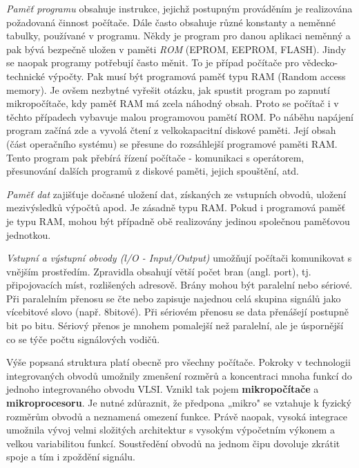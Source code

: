     \emph{Paměť programu} obsahuje instrukce, jejichž postupným prováděním je realizována požadovaná činnost 
    počítače. Dále často obsahuje různé konstanty a neměnné tabulky, používané v programu. Někdy je program 
    pro danou aplikaci neměnný a pak bývá bezpečně uložen v paměti \emph{ROM} (EPROM, EEPROM, FLASH). Jindy 
    se naopak programy potřebují často měnit. To je případ počítače pro vědecko-technické výpočty. Pak musí 
    být programová paměť typu RAM (Random access memory). Je ovšem nezbytné vyřešit otázku, jak spustit 
    program po zapnutí mikropočítače, kdy paměť RAM má zcela náhodný obsah. Proto se počítač i v těchto 
    případech vybavuje malou programovou pamětí ROM. Po náběhu napájení program začíná zde a vyvolá čtení z 
    velkokapacitní diskové paměti. Její obsah (část operačního systému) se přesune do rozsáhlejší programové 
    paměti RAM. Tento program pak přebírá řízení počítače - komunikaci s operátorem, přesunování dalších 
    programů z diskové paměti, jejich spouštění, atd.
    
    \emph{Paměť dat} zajišťuje dočasné uložení dat, získaných ze vstupních obvodů, uložení mezivýsledků 
    výpočtů apod. Je zásadně typu RAM. Pokud i programová paměť je typu RAM, mohou být případně obě 
    realizovány jedinou společnou paměťovou jednotkou.
    
    \emph{Vstupní a výstupní obvody (l/O - Input/Output)} umožňují počítači komunikovat s vnějším prostředím. 
    Zpravidla obsahují větší počet bran (angl. port), tj. připojovacích míst, rozlišených adresově. Brány 
    mohou být paralelní nebo sériové. Při paralelním přenosu se čte nebo zapisuje najednou celá skupina 
    signálů jako vícebitové slovo (např. 8bitové). Při sériovém přenosu se data přenášejí postupně bit po 
    bitu. Sériový přenos je mnohem pomalejší než paralelní, ale je úspornější co se týče počtu signálových 
    vodičů.
    
    Výše popsaná struktura platí obecně pro všechny počítače. Pokroky v technologii integrovaných obvodů 
    umožnily zmenšení rozměrů a koncentraci mnoha funkcí do jednoho integrovaného obvodu VLSI. Vznikl tak 
    pojem \textbf{mikropočítače} a \textbf{mikroprocesoru}. Je nutné zdůraznit, že předpona „mikro" se 
    vztahuje k fyzický rozměrům obvodů a neznamená omezení funkce. Právě naopak, vysoká integrace umožnila 
    vývoj velmi složitých architektur s vysokým výpočetním výkonem a velkou variabilitou funkcí. Soustředění 
    obvodů na jednom čipu dovoluje zkrátit spoje a tím i zpoždění signálu.
    
